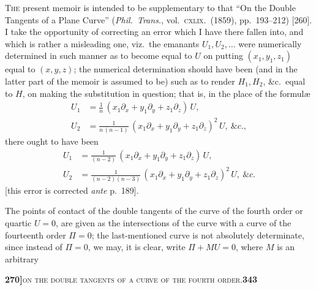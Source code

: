 \documentclass[11pt]{article}
\begin{document}
\medskip

\noindent\textsc{The} present memoir is intended to be supplementary to that ``On the Double Tangents of a Plane Curve'' (\textit{Phil.\ Trans.}, vol.~\textsc{cxlix}.\ (1859), pp.~193--212) [260]. I take the opportunity of correcting an error which I have there fallen into, and which is rather a misleading one, viz.\ the emanants $U_1, U_2,\ldots$ were numerically determined in such manner as to become equal to $U$ on putting $(x_1, y_1, z_1)$ equal to $(x, y, z)$; the numerical determination should have been (and in the latter part of the memoir is assumed to be) such as to render $H_1, H_2$, \&c.\ equal to $H$, on making the substitution in question; that is, in the place of the formul\ae
\[
\begin{aligned}
   U_1 &= \tfrac{1}{n}\,(x_1\partial_x + y_1\partial_y + z_1\partial_z)\,U,\\
   U_2 &= \tfrac{1}{n\,(n-1)}\,(x_1\partial_x + y_1\partial_y + z_1\partial_z)^2\,U,\ \&c.,
\end{aligned}
\]
there ought to have been
\[
\begin{aligned}
   U_1 &= \tfrac{1}{(n-2)}\,(x_1\partial_x + y_1\partial_y + z_1\partial_z)\,U,\\
   U_2 &= \tfrac{1}{(n-2)(n-3)}\,(x_1\partial_x + y_1\partial_y + z_1\partial_z)^2\,U,\ \&c.
\end{aligned}
\]
[this error is corrected \textit{ante} p.~189].

\medskip

\noindent The points of contact of the double tangents of the curve of the fourth order or quartic $U = 0$, are given as the intersections of the curve with a curve of the fourteenth order $\Pi = 0$; the last-mentioned curve is not absolutely determinate, since instead of $\Pi = 0$, we may, it is clear, write $\Pi + M U = 0$, where $M$ is an arbitrary

\newpage
\setcounter{page}{343}

\noindent\textbf{270]}\hfill\textsc{on the double tangents of a curve of the fourth order.}\hfill\textbf{343}

\medskip
\end{document}
